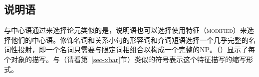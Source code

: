 \subsection{说明语}
\label{Abschnitt-HPSG-Adjunkte}\label{sec-adjuncts-hpsg}

与中心语通过\subcat 来选择论元类似的是，说明语也可以选择使用特征（\textsc{modified}）来选择他们的中心语。修饰名词和关系小句的形容词和介词短语选择一个几乎完整的名词性投射，即一个名词只需要与限定词相组合以构成一个完整的NP。（）显示了每个对象的描写。与\xbart （请看第~\ref{sec-xbar}节）类似的符号\nbar 表示这个特征描写的缩写形式。

